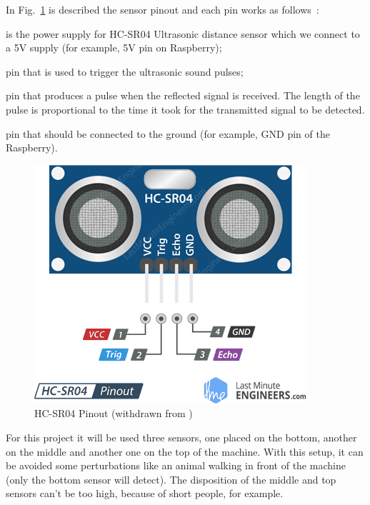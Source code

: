 In Fig.~\ref{fig:sensor-pinout} is described the sensor pinout and each pin works as follows~\cite{sensor}:
%
\begin{enum-c}
\item is the power supply for HC-SR04 Ultrasonic distance sensor which we connect to a 5V supply (for example, 5V pin on Raspberry);
\item pin that is used to trigger the ultrasonic sound pulses;
\item pin that produces a pulse when the reflected signal is received. The length of the pulse is proportional to the time it took for the transmitted signal to be detected.
\item pin that should be connected to the ground (for example, GND pin of the Raspberry).
\end{enum-c}
%
\begin{figure}[htb!]
\centering
    \includegraphics[width=0.4\columnwidth]{./img/sensor-pinout.png}
  \caption{HC-SR04 Pinout (withdrawn from \cite{sensor})}%
\label{fig:sensor-pinout}
\end{figure}

For this project it will be used three sensors, one placed on the bottom, another on the middle and another one on the top of the machine. 
With this setup, it can be avoided some perturbations like an animal walking in front of the machine (only the bottom sensor will detect). The disposition of the middle and top sensors can't be too high, because of short people, for example.

%

